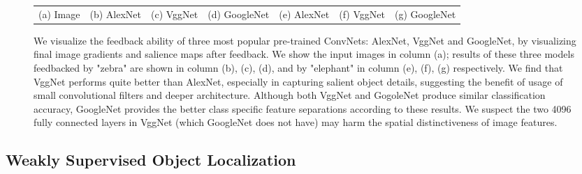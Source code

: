 \begin{figure}
\begin{center}
\begin{tabular}{ccccccc}
{\small (a) Image} &
{\small (b) AlexNet} &
{\small (c) VggNet} &
{\small (d) GoogleNet} &
{\small (e) AlexNet} &
{\small (f) VggNet} &
{\small (g) GoogleNet} \\
\end{tabular}
\caption{We visualize the feedback ability of three most popular pre-trained ConvNets: AlexNet, VggNet and GoogleNet, by visualizing final image gradients and salience maps after feedback. We show the input images in column (a); results of these three models feedbacked by "zebra" are shown in column (b), (c), (d), and by "elephant" in column (e), (f), (g) respectively. We find that VggNet performs quite better than AlexNet, especially in capturing salient object details, suggesting the benefit of usage of small convolutional filters and deeper architecture. Although both VggNet and GogoleNet produce similar classification accuracy, GoogleNet provides the better class specific feature separations according to these results. We suspect the two 4096 fully connected layers in VggNet (which GoogleNet does not have) may harm the spatial distinctiveness of image features.}
\label{fig:model_compare}
\end{center}
\end{figure}


\subsection{Weakly Supervised Object Localization}
\label{subsec:localization}

